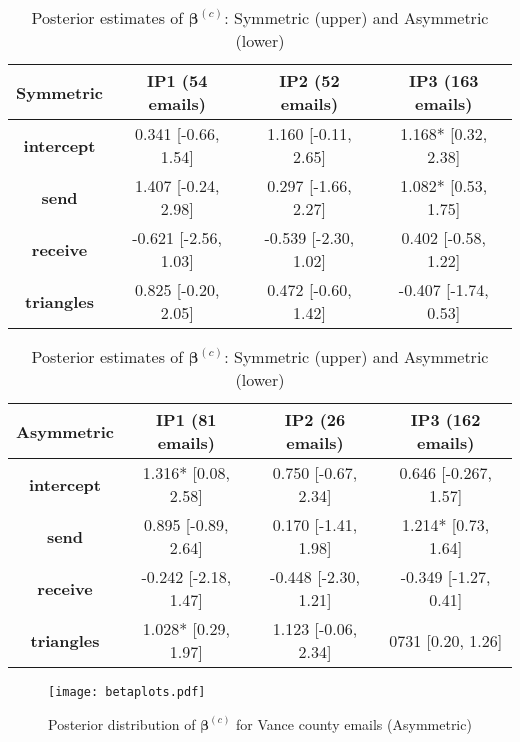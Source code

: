 \documentclass[a4paper]{article}
\begin{document}
	\normalsize
	\clearpage
\footnotesize
\begin{table}[ht]
	\centering
		\begin{tabular}{|c|c|c|c|} 
			\hline
			\textbf{Symmetric}& \textbf{IP1} (54 emails) & \textbf{IP2} (52 emails) &\textbf{IP3} (163 emails) \\
			\hline
			\textbf{intercept} & 0.341 [-0.66, 1.54]& 1.160 [-0.11, 2.65]& 1.168* [0.32, 2.38]\\
			\textbf{send}&  1.407 [-0.24, 2.98]& 0.297 [-1.66, 2.27]& 1.082* [0.53, 1.75]\\
			\textbf{receive}& -0.621 [-2.56, 1.03]& -0.539 [-2.30, 1.02]& 0.402 [-0.58, 1.22]\\
			\textbf{triangles} & 0.825 [-0.20, 2.05]&  0.472 [-0.60, 1.42]& -0.407 [-1.74, 0.53]\\
			\hline
		\end{tabular}
	\begin{tabular}{|c|c|c|c|} 
		\hline
		\textbf{Asymmetric}& \textbf{IP1} (81 emails) & \textbf{IP2} (26 emails) &\textbf{IP3} (162 emails) \\
		\hline
		\textbf{intercept} &1.316* [0.08, 2.58]& 0.750 [-0.67, 2.34]& 0.646 [-0.267, 1.57]\\
		\textbf{send}&  0.895 [-0.89, 2.64]& 0.170 [-1.41, 1.98]& 1.214* [0.73, 1.64]\\
		\textbf{receive}& -0.242 [-2.18, 1.47]& -0.448 [-2.30, 1.21]& -0.349 [-1.27, 0.41]\\
		\textbf{triangles} & 1.028* [0.29, 1.97]&  1.123 [-0.06, 2.34]& 0731 [0.20, 1.26]\\
		\hline
	\end{tabular}
	\caption {Posterior estimates of $\boldsymbol{\beta}^{(c)}$: Symmetric (upper) and Asymmetric (lower)}
	\label{table:Vancebeta}
\end{table}
\normalsize 	
\begin{figure}[ht]
	\centering
	\texttt{[image: betaplots.pdf]} 
	\caption{Posterior distribution of  $\boldsymbol{\beta}^{(c)}$ for Vance county emails (Asymmetric)}
	\label{fig:Vanceboxplot}
\end{figure}
\newpage
\normalsize
\end{document}
